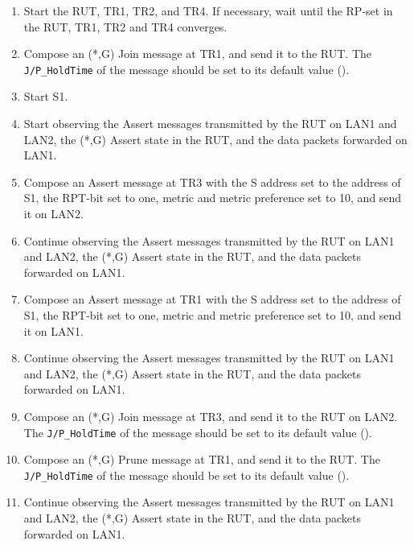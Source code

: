 \documentclass[11pt]{report}
\begin{document}
\begin{enumerate}

  \item Start the RUT, TR1, TR2, and TR4. If necessary, wait until the RP-set
  in the RUT, TR1, TR2 and TR4 converges.

  \item Compose an (*,G) Join message at TR1, and send it to the RUT.
  The \verb=J/P_HoldTime= of the message should be set to its default
  value ({\PimsmJPHoldTime}).

  \item Start S1.

  \item Start observing the Assert messages transmitted by the RUT on
  LAN1 and LAN2, the (*,G) Assert state in the RUT, and the data packets
  forwarded on LAN1.

  \item Compose an Assert message at TR3 with the S address set to the
  address of S1, the RPT-bit set to one, metric and metric preference set to
  10, and send it on LAN2.

  \item Continue observing the Assert messages transmitted by the RUT on
  LAN1 and LAN2, the (*,G) Assert state in the RUT, and the data packets
  forwarded on LAN1.

  \item Compose an Assert message at TR1 with the S address set to the
  address of S1, the RPT-bit set to one, metric and metric preference set to
  10, and send it on LAN1.

  \item Continue observing the Assert messages transmitted by the RUT on
  LAN1 and LAN2, the (*,G) Assert state in the RUT, and the data packets
  forwarded on LAN1.

  \item Compose an (*,G) Join message at TR3, and send it to the RUT on LAN2.
  The \verb=J/P_HoldTime= of the message should be set to its default
  value ({\PimsmJPHoldTime}).

  \item Compose an (*,G) Prune message at TR1, and send it to the RUT.
  The \verb=J/P_HoldTime= of the message should be set to its default
  value ({\PimsmJPHoldTime}).

  \item Continue observing the Assert messages transmitted by the RUT on
  LAN1 and LAN2, the (*,G) Assert state in the RUT, and the data packets
  forwarded on LAN1.

\end{enumerate}
\end{document}
